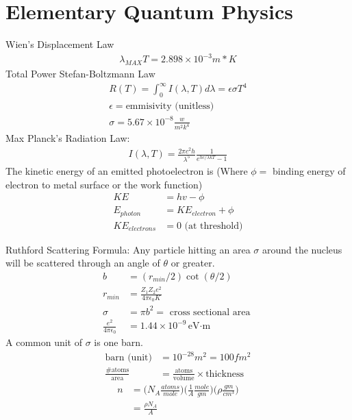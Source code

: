 \chapter{Elementary Quantum Physics}
\thispagestyle{fancy}
\begin{multicols}{2}
Wien's Displacement Law
\begin{align}
\lambda_{MAX}T=2.898 \times 10^{-3}m*K
\end{align}
Total Power Stefan-Boltzmann Law
\begin{align}
R(T)= \int_{0}^{\infty}I(\lambda,T)d\lambda = \epsilon \sigma T^4 \\
\epsilon = \textrm{emmisivity (unitless)} \\
\sigma = 5.67 \times 10^{-8}\frac{w}{m^2k^4}
\end{align}
Max Planck's Radiation Law:
\begin{align}
I(\lambda,T)=\frac{2\pi c^2h}{\lambda^5}\frac{1}{e^{hc/\lambda kT}-1}
\end{align}
The kinetic energy of an emitted photoelectron is (Where $\phi =$ binding energy of electron to metal surface or the work function)
\begin{align}
KE &= hv- \phi \\
E_{photon} &= KE_{electron} + \phi \\
KE_{electrons} &=0 \textrm{ (at threshold)}
\end{align}

Ruthford Scattering Formula: Any particle hitting an area $\sigma$ around the nucleus will be scattered through an angle of $\theta$ or greater.
\begin{align}
b &= (r_{min}/2) \cot (\theta /2) \\
r_{min} &= \frac{Z_1Z_2e^2}{4 \pi \epsilon_0 K} \\
\sigma &= \pi b^2 = \textrm{ cross sectional area } \\
\frac{e^2}{4\pi\epsilon_0} &= 1.44 \times 10^{-9} \textrm{eV$\cdot$m}
\end{align}
A common unit of $\sigma$ is one barn.
\begin{align}
\textrm{barn (unit)} &= 10^{-28} m^2 = 100 fm^2 \\
\frac{ \textrm{\# atoms} }{ \textrm{area} } &= \frac{ \textrm{atoms} }{ \textrm{volume} } \times \textrm{thickness}
\end{align}
\begin{align}
n &= \bigg(N_A\frac{atoms}{mole}\bigg)\bigg(\frac{1}{A}\frac{mole}{gm}\bigg)\bigg(\rho \frac{gm}{cm^3}\bigg) \\ &= \frac{\rho N_A}{A}
\end{align}


\end{multicols}
